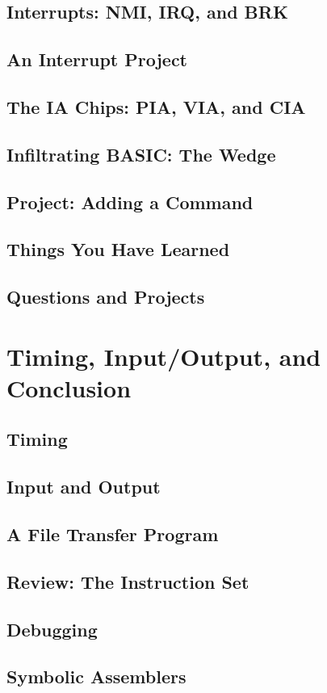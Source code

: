 \documentclass[11pt,a4paper,titlepage]{memoir}
\begin{document}
\section{Interrupts: NMI, IRQ, and BRK}
\section{An Interrupt Project}
\section{The IA Chips: PIA, VIA, and CIA}
\section{Infiltrating BASIC: The Wedge}
\section{Project: Adding a Command}
\section{Things You Have Learned}
\section{Questions and Projects}
\chapter{Timing, Input/Output, and Conclusion}
\section{Timing}
\section{Input and Output}
\section{A File Transfer Program}
\section{Review: The Instruction Set}
\section{Debugging}
\section{Symbolic Assemblers}
\end{document}
